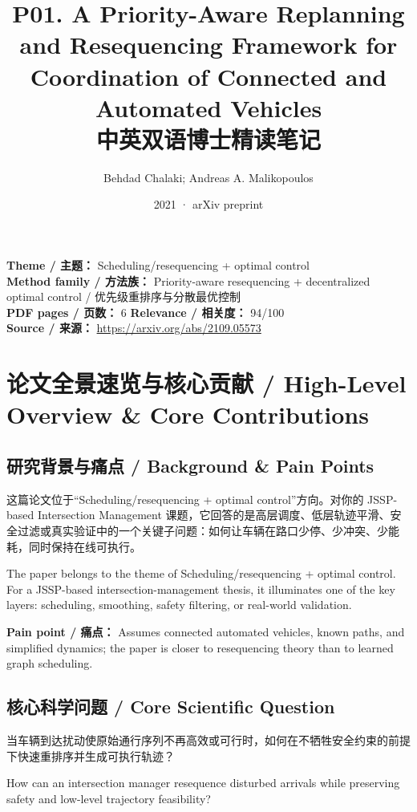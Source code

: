 \documentclass[UTF8,a4paper,11pt,fontset=fandol]{ctexart}
\title{P01. A Priority-Aware Replanning and Resequencing Framework for Coordination of Connected and Automated Vehicles\\中英双语博士精读笔记}
\author{Behdad Chalaki; Andreas A. Malikopoulos}
\date{2021 · arXiv preprint}
\begin{document}
\maketitle

\noindent\textbf{Theme / 主题：} Scheduling/resequencing + optimal control\\
\textbf{Method family / 方法族：} Priority-aware resequencing + decentralized optimal control / 优先级重排序与分散最优控制\\
\textbf{PDF pages / 页数：} 6 \quad
\textbf{Relevance / 相关度：} 94/100\\
\textbf{Source / 来源：} \url{https://arxiv.org/abs/2109.05573}

\section{论文全景速览与核心贡献 / High-Level Overview \& Core Contributions}
\subsection{研究背景与痛点 / Background \& Pain Points}
这篇论文位于“Scheduling/resequencing + optimal control”方向。对你的 JSSP-based Intersection Management 课题，它回答的是高层调度、低层轨迹平滑、安全过滤或真实验证中的一个关键子问题：如何让车辆在路口少停、少冲突、少能耗，同时保持在线可执行。

The paper belongs to the theme of Scheduling/resequencing + optimal control. For a JSSP-based intersection-management thesis, it illuminates one of the key layers: scheduling, smoothing, safety filtering, or real-world validation.

\textbf{Pain point / 痛点：} Assumes connected automated vehicles, known paths, and simplified dynamics; the paper is closer to resequencing theory than to learned graph scheduling.

\subsection{核心科学问题 / Core Scientific Question}
当车辆到达扰动使原始通行序列不再高效或可行时，如何在不牺牲安全约束的前提下快速重排序并生成可执行轨迹？

How can an intersection manager resequence disturbed arrivals while preserving safety and low-level trajectory feasibility?
\end{document}
